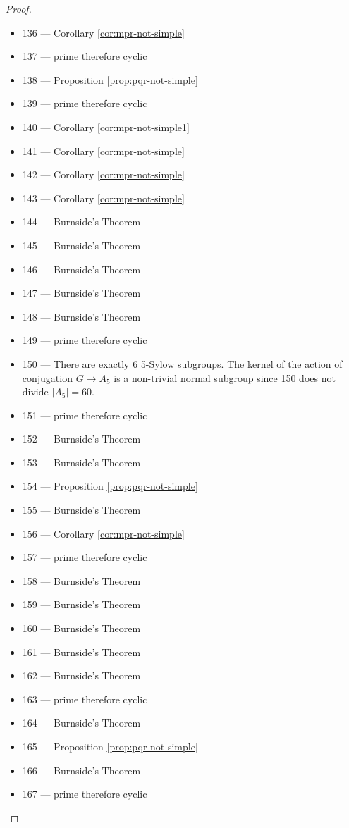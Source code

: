 \begin{proof}
\begin{itemize}
\item 136 --- Corollary \ref{cor:mpr-not-simple}
\item 137 --- prime therefore cyclic
\item 138 --- Proposition \ref{prop:pqr-not-simple}
\item 139 --- prime therefore cyclic
\item 140 --- Corollary \ref{cor:mpr-not-simple1}
\item 141 --- Corollary \ref{cor:mpr-not-simple}
\item 142 --- Corollary \ref{cor:mpr-not-simple}
\item 143 --- Corollary \ref{cor:mpr-not-simple}
\item 144 --- Burnside's Theorem
\item 145 --- Burnside's Theorem
\item 146 --- Burnside's Theorem
\item 147 --- Burnside's Theorem
\item 148 --- Burnside's Theorem
\item 149 --- prime therefore cyclic
\item 150 --- There are exactly 6 5-Sylow subgroups. The kernel of the action of conjugation $G \rightarrow A_5$ is a non-trivial normal subgroup since 150 does not divide $|A_5| = 60$.
\item 151 --- prime therefore cyclic
\item 152 --- Burnside's Theorem
\item 153 --- Burnside's Theorem
\item 154 --- Proposition \ref{prop:pqr-not-simple}
\item 155 --- Burnside's Theorem
\item 156 --- Corollary \ref{cor:mpr-not-simple}
\item 157 --- prime therefore cyclic
\item 158 --- Burnside's Theorem
\item 159 --- Burnside's Theorem
\item 160 --- Burnside's Theorem
\item 161 --- Burnside's Theorem
\item 162 --- Burnside's Theorem
\item 163 --- prime therefore cyclic
\item 164 --- Burnside's Theorem
\item 165 --- Proposition \ref{prop:pqr-not-simple}
\item 166 --- Burnside's Theorem
\item 167 --- prime therefore cyclic
\end{itemize}
\end{proof}

